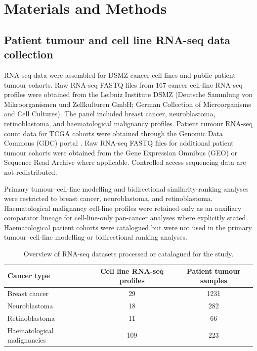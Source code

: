 \section{Materials and Methods}

\subsection{Patient tumour and cell line RNA-seq data collection}

RNA-seq data were assembled for DSMZ cancer cell lines and public patient tumour cohorts. Raw RNA-seq FASTQ files from 167 cancer cell-line RNA-seq profiles were obtained from the Leibniz Institute DSMZ (Deutsche Sammlung von Mikroorganismen und Zellkulturen GmbH; German Collection of Microorganisms and Cell Cultures). The panel included breast cancer, neuroblastoma, retinoblastoma, and haematological malignancy profiles. Patient tumour RNA-seq count data for TCGA cohorts were obtained through the Genomic Data Commons (GDC) portal \citep{GeistlingerRamos2025}. Raw RNA-seq FASTQ files for additional patient tumour cohorts were obtained from the Gene Expression Omnibus (GEO) or Sequence Read Archive where applicable. Controlled access sequencing data are not redistributed.

Primary tumour--cell-line modelling and bidirectional similarity-ranking analyses were restricted to breast cancer, neuroblastoma, and retinoblastoma. Haematological malignancy cell-line profiles were retained only as an auxiliary comparator lineage for cell-line-only pan-cancer analyses where explicitly stated. Haematological patient cohorts were catalogued but were not used in the primary tumour--cell-line modelling or bidirectional ranking analyses.

\begin{table}[H]
\centering
\caption{Overview of RNA-seq datasets processed or catalogued for the study.}
\label{tab:dataset_overview}
\begin{tabular}{lcc}
\toprule
Cancer type & Cell line RNA-seq profiles & Patient tumour samples \\
\midrule
Breast cancer & 29 & 1231 \\
Neuroblastoma & 18 & 282 \\
Retinoblastoma & 11 & 66 \\
Haematological malignancies & 109 & 223 \\
\bottomrule
\end{tabular}  
\end{table}


